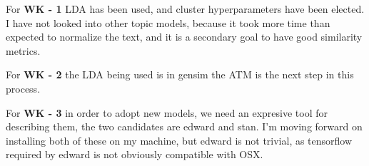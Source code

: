 \documentclass{article}
\begin{document}
\begin{multicols}{2}
For {\bf WK - 1} LDA has been used, and cluster hyperparameters have been elected. I have not looked into other topic models, because it took more time than expected to normalize the text, and it is a secondary goal to have good similarity metrics.

For {\bf WK - 2} the LDA being used is in gensim the ATM is the next step in this process.

For {\bf WK - 3} in order to  adopt new models, we need an expresive tool for describing them, the two candidates are edward and stan. I'm moving forward on installing both of these on my machine, but edward is not trivial, as tensorflow required by edward is not obviously compatible with OSX.

\begin{comment}


\section{Objectives}


\section{Materials}

\end{comment}
\end{multicols}
\end{document}
